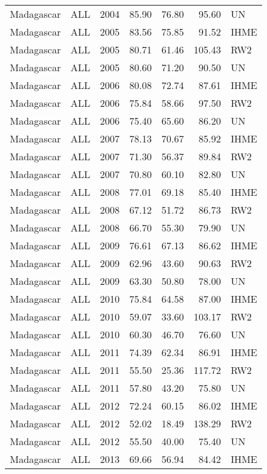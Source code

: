 \begin{longtable}{lllrrrl}
  Madagascar & ALL & 2004 & 85.90 & 76.80 & 95.60 & UN \\ 
  Madagascar & ALL & 2005 & 83.56 & 75.85 & 91.52 & IHME \\ 
  Madagascar & ALL & 2005 & 80.71 & 61.46 & 105.43 & RW2 \\ 
  Madagascar & ALL & 2005 & 80.60 & 71.20 & 90.50 & UN \\ 
  Madagascar & ALL & 2006 & 80.08 & 72.74 & 87.61 & IHME \\ 
  Madagascar & ALL & 2006 & 75.84 & 58.66 & 97.50 & RW2 \\ 
  Madagascar & ALL & 2006 & 75.40 & 65.60 & 86.20 & UN \\ 
  Madagascar & ALL & 2007 & 78.13 & 70.67 & 85.92 & IHME \\ 
  Madagascar & ALL & 2007 & 71.30 & 56.37 & 89.84 & RW2 \\ 
  Madagascar & ALL & 2007 & 70.80 & 60.10 & 82.80 & UN \\ 
  Madagascar & ALL & 2008 & 77.01 & 69.18 & 85.40 & IHME \\ 
  Madagascar & ALL & 2008 & 67.12 & 51.72 & 86.73 & RW2 \\ 
  Madagascar & ALL & 2008 & 66.70 & 55.30 & 79.90 & UN \\ 
  Madagascar & ALL & 2009 & 76.61 & 67.13 & 86.62 & IHME \\ 
  Madagascar & ALL & 2009 & 62.96 & 43.60 & 90.63 & RW2 \\ 
  Madagascar & ALL & 2009 & 63.30 & 50.80 & 78.00 & UN \\ 
  Madagascar & ALL & 2010 & 75.84 & 64.58 & 87.00 & IHME \\ 
  Madagascar & ALL & 2010 & 59.07 & 33.60 & 103.17 & RW2 \\ 
  Madagascar & ALL & 2010 & 60.30 & 46.70 & 76.60 & UN \\ 
  Madagascar & ALL & 2011 & 74.39 & 62.34 & 86.91 & IHME \\ 
  Madagascar & ALL & 2011 & 55.50 & 25.36 & 117.72 & RW2 \\ 
  Madagascar & ALL & 2011 & 57.80 & 43.20 & 75.80 & UN \\ 
  Madagascar & ALL & 2012 & 72.24 & 60.15 & 86.02 & IHME \\ 
  Madagascar & ALL & 2012 & 52.02 & 18.49 & 138.29 & RW2 \\ 
  Madagascar & ALL & 2012 & 55.50 & 40.00 & 75.40 & UN \\ 
  Madagascar & ALL & 2013 & 69.66 & 56.94 & 84.42 & IHME \\ 

\end{longtable}

